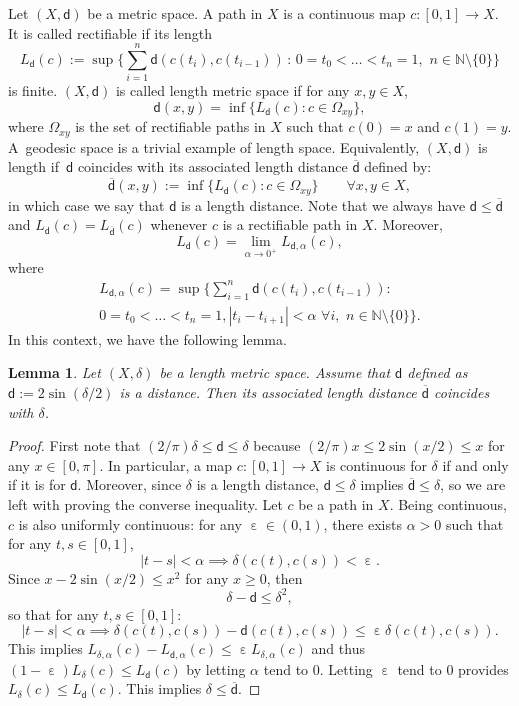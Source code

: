 \documentclass[10pt]{amsart}
\let\sep:
\let\backslash\setminus
\theoremstyle{plain}
\newtheorem{lemma}[theorem]{Lemma}
\theoremstyle{definition}
\newcommand{\setN}{\mathbb{N}}
\let\eps\upepsilon
\newcommand{\dist}{\mathsf{d}}
\begin{document}
Let $(X,\dist)$ be a metric space. A path in $X$ is a continuous map $c:[0,1]\to X$. It is called rectifiable if its length
\[\textstyle
L_\dist(c):=\sup \bigl\{ \sum_{i=1}^n \dist(c(t_i),c(t_{i-1})) \, \sep \, 0 = t_0 < \ldots < t_n = 1, \, \, n \in \setN\backslash\{0\} \bigr\}
\]
is finite. $(X,\dist)$ is called length metric space if for any $x, y \in X$,
\[
\dist(x,y) = \inf\{L_\dist (c) \sep c \in \Omega_{xy}\},
\]
where $\Omega_{xy}$ is the set of rectifiable paths in $X$ such that $c(0)=x$ and $c(1)=y$. A~geodesic space is a trivial example of length space. Equivalently, $(X,\dist)$ is length if~$\dist$ coincides with its associated length distance $\overline{\dist}$ defined by:
\[
\overline{\dist}(x,y):= \inf\{L_\dist (c) \sep c \in \Omega_{xy}\}\qquad \forall x,y \in X,
\]
in which case we say that $\dist$ is a length distance. Note that we always have $\dist \le \overline{\dist}$ and $L_{\dist}(c)=L_{\overline{\dist}}(c)$ whenever $c$ is a rectifiable path in $X$. Moreover,
\[
L_\dist(c) = \lim_{\alpha \to 0^+} L_{\dist,\alpha}(c),
\]
where
\begin{multline*}
\textstyle
L_{\dist,\alpha}(c) = \sup \bigl\{ \sum_{i=1}^n \dist(c(t_i),c(t_{i-1})) \sep\\ 0 = t_0 < \ldots < t_n = 1, |t_i - t_{i+1}|<\alpha \, \, \forall i,\, \, n \in \setN\backslash\{0\} \bigr\}.
\end{multline*}
In this context, we have the following lemma.

\begin{lemma}\label{lem:length}
Let $(X,\delta)$ be a length metric space. Assume that $\dist$ defined as $\dist:=2\sin(\delta/2)$ is a distance. Then its associated length distance $\overline{\dist}$ coincides with $\delta$.
\end{lemma}

\begin{proof}
First note that $(2/\pi) \delta \le \dist \le \delta$ because $(2/\pi)x\le 2\sin(x/2)\le x$ for any $x\in [0,\pi]$. In particular, a map $c:[0,1]\to X$ is continuous for $\delta$ if and only if it is for $\dist$. Moreover, since $\delta$ is a length distance, $\dist \le \delta$ implies $\overline{\dist} \le \delta$, so we are left with proving the converse inequality. Let $c$ be a path in $X$. Being continuous, $c$ is also uniformly continuous: for any $\eps\in (0,1)$, there exists $\alpha>0$ such that for any $t,s \in [0,1]$,
\[
|t-s| < \alpha \implies \delta(c(t),c(s)) < \eps.
\]
Since $x- 2\sin(x/2)\le x^2$ for any $x\ge0$, then
\[
\delta - \dist \le \delta^2,
\]
so that for any $t,s \in [0,1]$:
\[
|t-s| < \alpha \implies \delta(c(t),c(s)) - \dist(c(t),c(s)) \le \eps \delta(c(t),c(s)).
\]
This implies $L_{\delta,\alpha}(c) - L_{\dist,\alpha}(c) \le \eps L_{\delta,\alpha}(c)$ and thus $(1-\eps)L_\delta(c) \le L_\dist(c)$ by letting $\alpha$ tend to $0$. Letting $\eps$ tend to $0$ provides $L_\delta(c) \le L_\dist(c)$. This implies $\delta \le \overline{\dist}$.
\end{proof}
\end{document}
